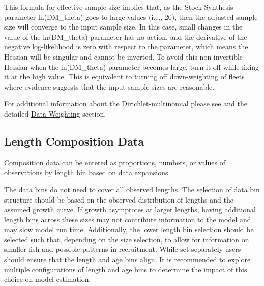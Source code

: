 This formula for effective sample size implies that, as the Stock Synthesis parameter ln(DM\_theta) goes to large values (i.e., 20), then the adjusted sample size will converge to the input sample size.  In this case, small changes in the value of the ln(DM\_theta) parameter has no action, and the derivative of the negative log-likelihood is zero with respect to the parameter, which means the Hessian will be singular and cannot be inverted. To avoid this non-invertible Hessian when the ln(DM\_theta) parameter becomes large, turn it off while fixing it at the high value. This is equivalent to turning off down-weighting of fleets where evidence suggests that the input sample sizes are reasonable.
	
For additional information about the Dirichlet-multinomial please see \citet{thorson-model-based-2017} and the detailed \hyperlink{DataWeight}{Data Weighting} section.

\hypertarget{CompTiming}{}
\subsection{Length Composition Data}
Composition data can be entered as proportions, numbers, or values of observations by length bin based on data expansions.  

The data bins do not need to cover all observed lengths.  The selection of data bin structure should be based on the observed distribution of lengths and the assumed growth curve. If growth asymptotes at larger lengths, having additional length bins across these sizes may not contribute information to the model and may slow model run time.  Additionally, the lower length bin selection should be selected such that, depending on the size selection, to allow for information on smaller fish and possible patterns in recruitment. While set separately users should ensure that the length and age bins align.  It is recommended to explore multiple configurations of length and age bins to determine the impact of this choice on model estimation.

